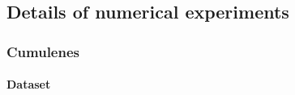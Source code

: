 \documentclass{article} \usepackage{iclr2024_conference,times}
\begin{document}
\begin{comment}
\subsection{Proof of infinite order message passing}

(This is a very rough sketch of the proof, and it needs polish)


Let's consider a graph, where its representation is given by a set of matrices $\mathbf{H}^{(0)}_i$ constructed from the graph's edge and node features.

The message update mechanism for our model can be defined as:
\begin{equation}
\mathbf{H}^{(1)}_i = \sum_{i'} \alpha^{(0)}_{i i'} (\mathbf{H}_{i'}^{(0)} - \lambda_{i i'} \mathbf{I}) = \sum_{i'} \alpha^{(0)}_{i i'} \sum_j \left( \frac{\mathbf{H}_{i'}^{(0)}}{\lambda^{(0)}_{i i'}} \right)^j
\end{equation}

Since the resolvent form a complete basis, a sufficiently large basis set (i.e., a large number of $\alpha$'s and $\mathbf{H}$'s) allows one to rewrite the formula as follows:
\begin{equation}
\sum_{i' j} \beta^{(0)}_{i i' j} (\mathbf{H}^{(0)}_i)^j
\end{equation}
where $\beta$ are arbitrary weights.

Applying this process again layer, we get:
\begin{equation}
\mathbf{A}^{(2)}_k = \sum_{k' l} \beta^{(1)}_{k k' l} \left( \sum_{i' j} \beta^{(0)}_{i i' j} (\mathbf{H}^{(0)}_i)^j \right)^l
\end{equation}

From the above equation, it can be observed that this type of message passing behaves as an infinite-body-order infinite-layer message passing model after just two updates.
\end{comment}

\subsection{Details of numerical experiments}
\label{sec:appendix-numerical}


\subsubsection{Cumulenes}



\paragraph{Dataset}
\end{document}
